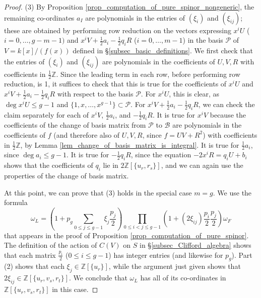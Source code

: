 \documentclass{article} %
\numberwithin{equation}{section}
\newcommand{\Z}{\mathbb{Z}}
\begin{document}
\begin{proof}
    (3) By Proposition \ref{prop_computation_of_pure_spinor_nongeneric}, the remaining co-ordinates $a_I$ are polynomials in the entries of $(\xi_i)$ and $(\xi_{ij})$; these are obtained by performing row reduction on the vectors expressing $x^i U$ ($i = 0, \dots, g-m-1)$ and $x^i V + \frac{1}{2} a_i - \frac{1}{2} q_i R$ ($i = 0, \dots, m-1$) in the basis $\mathcal{P}$ of $V = k[x] / (f(x))$ defined in \S \ref{subsec_basic_definitions}. We first check that the entries of $(\xi_i)$ and $(\xi_{ij})$ are polynomials in the coefficients of $U, V, R$ with coefficients in $\frac{1}{2} \Z$. Since the leading term in each row, before performing row reduction, is 1, it suffices to  check that this is true for the coefficients of  $x^i U$ and $x^i V + \frac{1}{2} a_i - \frac{1}{2} q_i R$ with respect to the basis $\mathcal{P}$. For $x^i U$, this is clear, as $\deg x^i U \leq g-1$ and $\{ 1, x, \dots, x^{g-1} \} \subset \mathcal{P}$. For $x^i V + \frac{1}{2} a_i - \frac{1}{2} q_i R$, we can check the claim separately for each of $x^i V$, $\frac{1}{2} a_i$, and $-\frac{1}{2} q_i R$. It is true for $x^i V$ because the coefficients of the change of basis matrix from $\mathcal{P}$ to $\mathcal{B}$ are polynomials in the coefficients of $f$ (and therefore also of $U, V, R$, since $f = U V + R^2$) with coefficients in $\frac{1}{2} \Z$, by Lemma \ref{lem_change_of_basis_matrix_is_integral}. It is true for $\frac{1}{2} a_i$, since $\deg a_i \leq g-1$. It is true for $-\frac{1}{2}q_i R$, since the equation $-2 x^i R = q_i U + b_i$ shows that the coefficients of $q_i$ lie in $2 \Z[ \{ u_r, r_s \}]$, and we can again use the properties of the change of basis matrix. 

    At this point, we can prove that (3) holds in the special case $m = g$. We use the formula 
    \[ \omega_L = \left(1 +    p_g \sum_{0 \leq j \leq g-1} \xi_j \frac{p_j}{2} \right) \prod_{0 \leq i < j \leq g-1} \left(1 +  (2 \xi_{ij}) \frac{p_i}{2}  \frac{p_j}{2} \right) \omega_F \]
    that appears in the proof of Proposition \ref{prop_computation_of_pure_spinor}. The definition of the action of $C(V)$ on $S$ in \S \ref{subsec_Clifford_algebra} shows that each matrix $\frac{p_i}{2}$ ($0 \leq i \leq g-1$) has integer entries (and likewise for $p_g$). Part (2) shows that each  $\xi_j \in \Z[ \{ u_r \}]$, while the argument just given shows that $2 \xi_{ij} \in \Z[\{ u_r, v_s, r_t \}]$. We conclude that $\omega_L$ has all of its co-ordinates in $\Z[\{ u_r, v_s, r_t \}]$ in this case. 


\end{proof}
\end{document}
